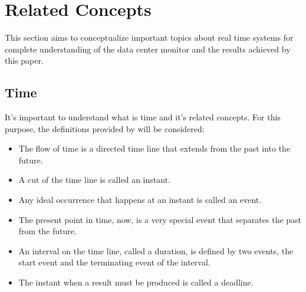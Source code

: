 \documentclass[12pt]{article}
\begin{document}
\fi

\iffalse
The technology advances with servers and networking equipment enables the equipment that filled a room, can now be placed 
in a single rack; creating excessive power and heat problems \cite{hassan2013temperature}.

On average, existing data centres have required around twice the amount of cooling but many of them are still facing 
problems with high temperature zones created within the data centres \cite{hassan2013temperature}.

The American Society of Heating, Refrigerating, and Air-Conditioning Engineers recommend a low end temperature of
18\degree C (64.4\degree F), a high end temperature of 27\degree C (80.6\degree F), low end moisture of 5.5\degree C 
(41.9\degree F) dew point and a high end moisture of 60\% relative humidity and 15\degree C (59\degree F) dew 
point \cite{ashrae9}.
\fi

\section{Related Concepts}

This section aims to conceptualize important topics about real time systems for complete understanding of the data center 
monitor and the results achieved by this paper.

\subsection{Time}

It's important to understand what is time and it's related concepts. For this purpose, the definitions provided by
\cite{kopetz2011real} will be considered: 
\begin{itemize}
 \item The flow of time is a directed time line that extends from the past into the future.
 \item A cut of the time line is called an instant.
 \item Any ideal occurrence that happens at an instant is called an event.
 \item The present point in time, now, is a very special event that separates the past from the future.
 \item An interval on the time line, called a duration, is defined by two events, the start event and the 
terminating event of the interval.
 \item The instant when a result must be produced is called a deadline.
\end{itemize}
\end{document}
